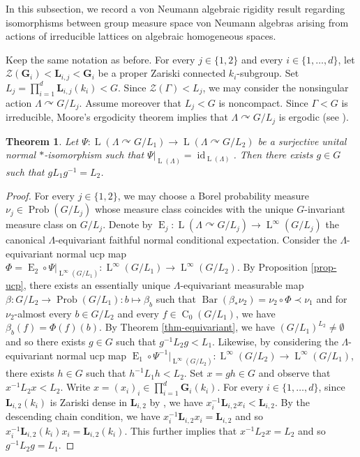 \documentclass[11pt]{amsart}
\numberwithin{equation}{section}
\theoremstyle{plain}
\newtheorem{thm}{Theorem}[section]
\theoremstyle{definition}
\newcommand{\id}{\operatorname{id}}
\newcommand{\Prob}{\operatorname{Prob}}
\newcommand{\bary}{\operatorname{Bar}}
\newcommand{\rE}{\operatorname{ E}}
\newcommand{\rC}{\operatorname{C}}
\newcommand{\rL}{\operatorname{ L}}
\begin{document}
In this subsection, we record a von Neumann algebraic rigidity result regarding isomorphisms between group measure space von Neumann algebras arising from actions of irreducible lattices on algebraic homogeneous spaces. 

Keep the same notation as before. For every $j \in \{1, 2\}$ and every $i \in \{1, \dots, d\}$, let $\mathscr Z(\mathbf G_i) < \mathbf L_{i, j} <\mathbf G_i$ be a proper Zariski connected $k_i$-subgroup. Set $L_j = \prod_{i = 1}^d \mathbf L_{i, j}(k_i) < G$. Since $\mathscr Z(\Gamma) < L_j$, we may consider the nonsingular action $\Lambda \curvearrowright G/L_j$. Assume moreover that $L_j < G$ is noncompact. Since $\Gamma < G$ is irreducible, Moore's ergodicity theorem implies that $\Lambda \curvearrowright G/L_j$ is ergodic (see \cite{HM77}). 


\begin{thm}\label{thm-rigidity-homogeneous}
Let $\Psi : \rL(\Lambda \curvearrowright G/L_1) \to \rL(\Lambda \curvearrowright G/L_2)$ be a surjective unital normal $\ast$-isomorphism such that $\Psi|_{\rL(\Lambda)} = \id_{\rL(\Lambda)}$. Then there exists $g \in G$ such that $g L_1 g^{-1} = L_2$.
\end{thm}


\begin{proof}
For every $j \in \{1, 2\}$, we may choose a Borel probability measure $\nu_j \in \Prob(G/L_j)$ whose measure class coincides with the unique $G$-invariant measure class on $G/L_j$. Denote by $\rE_j : \rL(\Lambda \curvearrowright G/L_j) \to \rL^\infty(G/L_j)$ the canonical $\Lambda$-equivariant faithful normal conditional expectation. Consider the $\Lambda$-equivariant normal ucp map $\Phi = \rE_2 \circ \Psi|_{\rL^\infty(G/L_1)} : \rL^\infty(G/L_1) \to \rL^\infty(G/L_2)$. By Proposition \ref{prop-ucp}, there exists an essentially unique $\Lambda$-equivariant measurable map $\beta : G/L_2 \to \Prob(G/L_1) : b \mapsto \beta_b$ such that $\bary(\beta_\ast \nu_2) = \nu_2 \circ \Phi \prec \nu_1$ and for $\nu_2$-almost every $b \in G/L_2$ and every $f \in \rC_0(G/L_1)$, we have $\beta_b(f) = \Phi(f)(b)$. By Theorem \ref{thm-equivariant}, we have $(G/L_1)^{L_2} \neq \emptyset$ and so there exists $g \in G$ such that $g^{-1} L_2 g < L_1$. Likewise, by considering the $\Lambda$-equivariant normal ucp map $\rE_1 \circ \Psi^{-1}|_{\rL^\infty(G/L_2)} : \rL^\infty(G/L_2) \to \rL^\infty(G/L_1)$, there exists $h \in G$ such that $h^{-1} L_1 h < L_2$. Set $x = gh \in G$ and observe that $x^{-1} L_2 x < L_2$. Write $x = (x_i)_i \in \prod_{i = 1}^d \mathbf G_i(k_i)$. For every $i \in \{1, \dots, d\}$, since $\mathbf L_{i, 2}(k_i)$ is Zariski dense in $\mathbf L_{i, 2}$ by \cite[Proposition I.2.5.3]{Ma91}, we have $x_i^{-1} \mathbf L_{i, 2} x_i < \mathbf L_{i, 2}$. By the descending chain condition, we have $x_i^{-1} \mathbf L_{i, 2} x_i = \mathbf L_{i, 2}$ and so $x_i^{-1} \mathbf L_{i, 2}(k_i) x_i = \mathbf L_{i, 2}(k_i)$. This further implies that $x^{-1} L_2 x = L_2$ and so $g^{-1} L_2 g = L_1$.
\end{proof}
\end{document}
